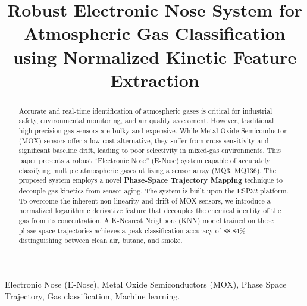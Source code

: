 \documentclass[conference]{IEEEtran}
\begin{document}
\title{Robust Electronic Nose System for Atmospheric Gas Classification using Normalized Kinetic Feature Extraction}

\author{
}

\maketitle

\begin{abstract}
Accurate and real-time identification of atmospheric gases is critical for industrial safety, environmental monitoring, and air quality assessment. However, traditional high-precision gas sensors are bulky and expensive. While Metal-Oxide Semiconductor (MOX) sensors offer a low-cost alternative, they suffer from cross-sensitivity and significant baseline drift, leading to poor selectivity in mixed-gas environments. This paper presents a robust ``Electronic Nose'' (E-Nose) system capable of accurately classifying multiple atmospheric gases utilizing a sensor array (MQ3, MQ136). The proposed system employs a novel \textbf{Phase-Space Trajectory Mapping} technique to decouple gas kinetics from sensor aging. The system is built upon the ESP32 platform. To overcome the inherent non-linearity and drift of MOX sensors, we introduce a normalized logarithmic derivative feature that decouples the chemical identity of the gas from its concentration. A K-Nearest Neighbors (KNN) model trained on these phase-space trajectories achieves a peak classification accuracy of 88.84\% distinguishing between clean air, butane, and smoke.
\end{abstract}

\begin{IEEEkeywords}
Electronic Nose (E-Nose), Metal Oxide Semiconductors (MOX), Phase Space Trajectory, Gas classification, Machine learning.
\end{IEEEkeywords}
\end{document}
